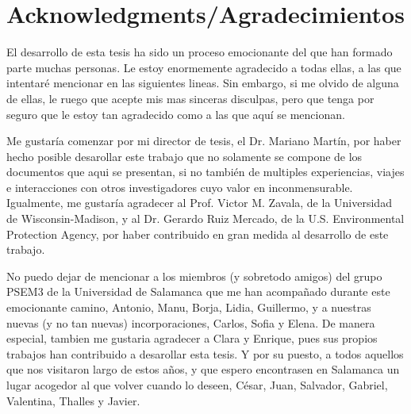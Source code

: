 



\bigskip

\begingroup
\let\clearpage\relax
\let\cleardoublepage\relax
\let\cleardoublepage\relax
\chapter*{Acknowledgments/Agradecimientos}
El desarrollo de esta tesis ha sido un proceso emocionante del que han formado parte muchas personas. Le estoy enormemente agradecido a todas ellas, a las que intentaré mencionar en las siguientes lineas. Sin embargo, si me olvido de alguna de ellas, le ruego que acepte mis mas sinceras disculpas, pero que tenga por seguro que le estoy tan agradecido como a las que aquí se mencionan.

Me gustaría comenzar por mi director de tesis, el Dr. Mariano Martín, por haber hecho posible desarollar este trabajo que no solamente se compone de los documentos que aqui se presentan, si no también de multiples experiencias, viajes e interacciones con otros investigadores cuyo valor en inconmensurable. Igualmente, me gustaría agradecer al Prof. Victor M. Zavala, de la Universidad de Wisconsin-Madison, y al Dr. Gerardo Ruiz Mercado, de la U.S. Environmental Protection Agency, por haber contribuido en gran medida al desarrollo de este trabajo.

No puedo dejar de mencionar a los miembros (y sobretodo amigos) del grupo PSEM3 de la Universidad de Salamanca que me han acompañado durante este emocionante camino, Antonio, Manu, Borja, Lidia, Guillermo, y a nuestras nuevas (y no tan nuevas) incorporaciones, Carlos, Sofia y Elena. De manera especial, tambien me gustaria agradecer a Clara y Enrique, pues sus propios trabajos han contribuido a desarollar esta tesis. Y por su puesto, a todos aquellos que nos visitaron largo de estos años, y que espero encontrasen en Salamanca un lugar acogedor al que volver cuando lo deseen, César, Juan, Salvador, Gabriel, Valentina, Thalles y Javier.

